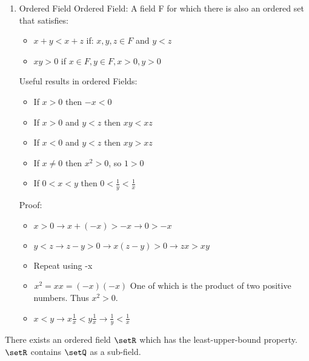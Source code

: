\documentclass[12pt, letterpaper]{paper}
\begin{document}
\begin{enumerate}
\item Ordered Field
  \label{sec:org4b78c5c}
  Ordered Field: A field F for which there is also an ordered set that
  satisfies:
  \begin{itemize}
  \item $x + y < x + z$ if: $x,y,z \in F$ and $y<z$
  \item $xy > 0$ if $x \in F, y \in F, x >0, y >0$
  \end{itemize}

  Useful results in ordered Fields:
  \begin{itemize}
  \item If $x > 0$ then $-x < 0$
  \item If $x > 0$ and $y < z$ then $xy < xz$
  \item If $x < 0$ and $y < z$ then $xy > xz$
  \item If $x \neq 0$ then $x^2 > 0$, so $1 > 0$
  \item If $0 < x < y$ then $0 < \frac{1}{y} < \frac{1}{x}$
  \end{itemize}

  Proof:
  \begin{itemize}
  \item $x > 0 \to x + (-x) > -x \to 0 > -x$
  \item $y < z \to z-y > 0 \to x(z-y) > 0 \to zx > xy$
  \item Repeat using -x
  \item $^{}x^{2} = xx = (-x)(-x)$ One of which is the product of two
    positive numbers. Thus $x^{2} > 0$.
  \item
    $x < y \to x \frac{1}{x} < y \frac{1}{x} \to \frac{1}{y} <
    \frac{1}{x}$
  \end{itemize}
  \vspace{ .33in }
\end{enumerate}

\begin{theorem}
  \label{thr:1.19}
  There exists an ordered field $\setR$ which has the
  least-upper-bound property.  $\setR$ contains $\setQ$ as a
  sub-field.
\end{theorem}
\end{document}
